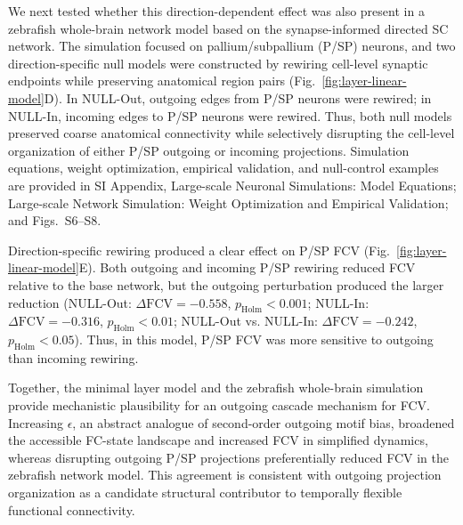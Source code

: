 \documentclass[9pt,twocolumn,twoside]{pnas-new}
\begin{document}
We next tested whether this direction-dependent effect was also present in a zebrafish whole-brain network model based on the synapse-informed directed SC network. The simulation focused on pallium/subpallium (P/SP) neurons, and two direction-specific null models were constructed by rewiring cell-level synaptic endpoints while preserving anatomical region pairs (Fig.~\ref{fig:layer-linear-model}D). In NULL-Out, outgoing edges from P/SP neurons were rewired; in NULL-In, incoming edges to P/SP neurons were rewired. Thus, both null models preserved coarse anatomical connectivity while selectively disrupting the cell-level organization of either P/SP outgoing or incoming projections. Simulation equations, weight optimization, empirical validation, and null-control examples are provided in SI Appendix, Large-scale Neuronal Simulations: Model Equations; Large-scale Network Simulation: Weight Optimization and Empirical Validation; and Figs.~S6--S8.

Direction-specific rewiring produced a clear effect on P/SP FCV (Fig.~\ref{fig:layer-linear-model}E). Both outgoing and incoming P/SP rewiring reduced FCV relative to the base network, but the outgoing perturbation produced the larger reduction (NULL-Out: $\Delta \mathrm{FCV} = -0.558$, $p_{\mathrm{Holm}} < 0.001$; NULL-In: $\Delta \mathrm{FCV} = -0.316$, $p_{\mathrm{Holm}} < 0.01$; NULL-Out vs. NULL-In: $\Delta \mathrm{FCV} = -0.242$, $p_{\mathrm{Holm}} < 0.05$). Thus, in this model, P/SP FCV was more sensitive to outgoing than incoming rewiring.

Together, the minimal layer model and the zebrafish whole-brain simulation provide mechanistic plausibility for an outgoing cascade mechanism for FCV. Increasing $\epsilon$, an abstract analogue of second-order outgoing motif bias, broadened the accessible FC-state landscape and increased FCV in simplified dynamics, whereas disrupting outgoing P/SP projections preferentially reduced FCV in the zebrafish network model. This agreement is consistent with outgoing projection organization as a candidate structural contributor to temporally flexible functional connectivity.
\end{document}
